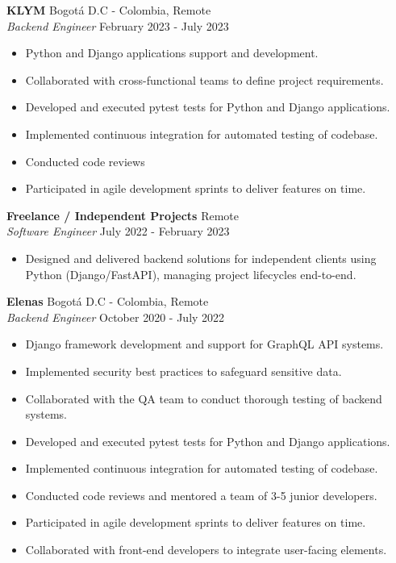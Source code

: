\documentclass[a4paper]{article}
\begin{document}
\vspace{-2mm}
\vspace*{-1mm}
\textbf{KLYM} \hfill Bogotá D.C - Colombia, Remote\\
\textit{Backend Engineer} \hfill February 2023 - July 2023\\
\vspace{-2mm}
\begin{itemize} \itemsep 0pt
	\item Python and Django applications support and development.
	\item Collaborated with cross-functional teams to define project requirements.
	\item Developed and executed pytest tests for Python and Django applications.
	\item Implemented continuous integration for automated testing of codebase.
	\item Conducted code reviews
	\item Participated in agile development sprints to deliver features on time.
\end{itemize}
\textbf{Freelance / Independent Projects} \hfill Remote\\
\textit{Software Engineer} \hfill July 2022 - February 2023\\
\vspace{-2mm}
\begin{itemize} \itemsep 0pt
	\item Designed and delivered backend solutions for independent clients using Python (Django/FastAPI), managing project lifecycles end-to-end.
\end{itemize}
\vspace{-2mm}
\vspace*{-1mm}
\textbf{Elenas} \hfill Bogotá D.C - Colombia, Remote\\
\textit{Backend Engineer} \hfill October 2020 - July 2022\\
\vspace{-2mm}
\begin{itemize} \itemsep 0pt
	\item Django framework development and support for GraphQL API systems.
	\item Implemented security best practices to safeguard sensitive data.
	\item Collaborated with the QA team to conduct thorough testing of backend systems.
	\item Developed and executed pytest tests for Python and Django applications.
	\item Implemented continuous integration for automated testing of codebase.
	\item Conducted code reviews and mentored a team of 3-5 junior developers.
	\item Participated in agile development sprints to deliver features on time.
	\item Collaborated with front-end developers to integrate user-facing elements.
\end{itemize}
\end{document}
